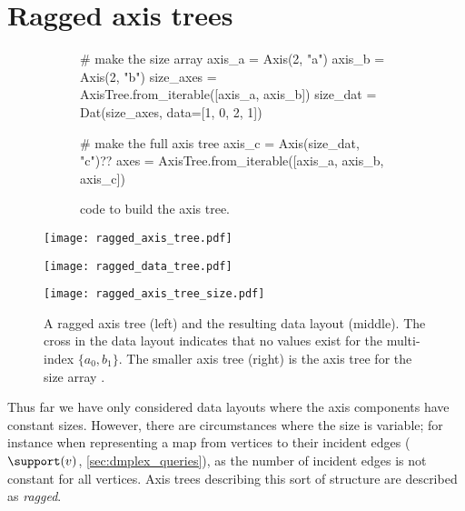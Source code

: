 \documentclass[thesis]{subfiles}
\begin{document}
\section{Ragged axis trees}
\label{sec:ragged_axis_trees}

\begin{figure}
  \centering
  \begin{subfigure}{.9\textwidth}
    \begin{pyalg2}
      # make the size array
      axis_a = Axis(2, "a")
      axis_b = Axis(2, "b")
      size_axes = AxisTree.from_iterable([axis_a, axis_b])
      size_dat = Dat(size_axes, data=[1, 0, 2, 1])

      # make the full axis tree
      axis_c = Axis(size_dat, "c")?\label{code:ragged_size_dat}?
      axes = AxisTree.from_iterable([axis_a, axis_b, axis_c])
    \end{pyalg2}
    \caption{ code to build the axis tree.}
  \end{subfigure}

  \vspace{1em}

  \begin{minipage}{.35\textwidth}
    \begin{center}
      \texttt{[image: ragged\_axis\_tree.pdf]}
    \end{center}
  \end{minipage}
  \begin{minipage}{.4\textwidth}
    \begin{center}
      \texttt{[image: ragged\_data\_tree.pdf]}
    \end{center}
  \end{minipage}
  \begin{minipage}{.2\textwidth}
    \begin{center}
      \texttt{[image: ragged\_axis\_tree\_size.pdf]}
    \end{center}
  \end{minipage}
  \caption{
    A ragged axis tree (left) and the resulting data layout (middle).
    The cross in the data layout indicates that no values exist for the multi-index $\{a_0, b_1\}$.
    The smaller axis tree (right) is the axis tree for the size array \pycode{[[1,0],[2,1]][?$i_a$?,?$i_b$?]}.
  }
  \label{fig:ragged_axis_tree}
\end{figure}

Thus far we have only considered data layouts where the axis components have constant sizes.
However, there are circumstances where the size is variable; for instance when representing a map from vertices to their incident edges ($\support(v)$, \cref{sec:dmplex_queries}), as the number of incident edges is not constant for all vertices.
Axis trees describing this sort of structure are described as \emph{ragged}.
\end{document}
